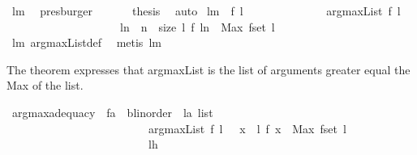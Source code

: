 \begin{isabellebody}
\ lm{}{}\ \isamarkupfalse%
\ presburger\ \isanewline
\ \ \isamarkupfalse%
\ \isamarkupfalse%
\ {\isacharquery}thesis\ \isamarkupfalse%
\ auto\isanewline
{}\isamarkupfalse%
%
\endisatagproof
{\isafoldproof}%
%
\isadelimproof
%
\endisadelimproof
\isanewline
\isanewline
{}\isamarkupfalse%
\ lm{}{}{\isacharcolon}\ \ f\ l\ \isanewline
\ \ \ \ \ \ \ \ \ \ \ \ \ {\isachardoublequoteopen}argmaxList\ f\ l\ {\isacharequal}\ \isanewline
\ \ \ \ \ \ \ \ \ \ \ \ \ \ \ \ \ \ \ {\isacharbrackleft}\ l{\isacharbang}n\ {\isachardot}\ n\ {\isacharless}{\isacharminus}\ {\isacharbrackleft}{}{\isachardot}{\isachardot}{\isacharless}size\ l{\isacharbrackright}{\isacharcomma}\ f\ {\isacharparenleft}l{\isacharbang}n{\isacharparenright}\ {\isasymge}\ Max\ {\isacharparenleft}f{\isacharbackquote}{\isacharparenleft}set\ l{\isacharparenright}{\isacharparenright}{\isacharbrackright}{\isachardoublequoteclose}\isanewline
%
\isadelimproof
\ \ \ \ \ \ %
\endisadelimproof
%
\isatagproof
{}\isamarkupfalse%
\ lm{}{}\ argmaxList{\isacharunderscore}def\ \isamarkupfalse%
\ {\isacharparenleft}metis\ lm{}{}{\isacharparenright}%
\endisatagproof
{\isafoldproof}%
%
\isadelimproof
%
\endisadelimproof
%
\begin{isamarkuptext}%
The theorem expresses that argmaxList is the list of arguments greater equal the Max of the list.%
\end{isamarkuptext}%
\isamarkuptrue%
\isamarkupfalse%
\ argmaxadequacy{\isacharcolon}\ \ f{\isacharcolon}{\isacharcolon}{\isachardoublequoteopen}{\isacharprime}a\ {\isacharequal}{\isachargreater}\ {\isacharparenleft}{\isacharprime}b{\isacharcolon}{\isacharcolon}linorder{\isacharparenright}{\isachardoublequoteclose}\ \ l{\isacharcolon}{\isacharcolon}{\isachardoublequoteopen}{\isacharprime}a\ list{\isachardoublequoteclose}\ \isanewline
\ \ \ \ \ \ \ \ \ \ \ \ \ \ \ \ \ \ \ \ \ \ \ \ \ {\isachardoublequoteopen}argmaxList\ f\ l\ {\isacharequal}\ {\isacharbrackleft}\ x\ {\isacharless}{\isacharminus}\ l{\isachardot}\ f\ x\ {\isasymge}\ Max\ {\isacharparenleft}f{\isacharbackquote}{\isacharparenleft}set\ l{\isacharparenright}{\isacharparenright}{\isacharbrackright}{\isachardoublequoteclose}\isanewline
\ \ \ \ \ \ \ \ \ \ \ \ \ \ \ \ \ \ \ \ \ \ \ \ {\isacharparenleft}\ {\isachardoublequoteopen}{\isacharquery}lh{\isacharequal}{\isacharunderscore}{\isachardoublequoteclose}{\isacharparenright}\ \isanewline

\end{isabellebody}
